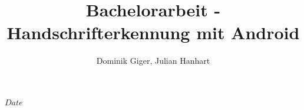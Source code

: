 \title{Bachelorarbeit - Handschrifterkennung mit Android}
\author{Dominik Giger, Julian Hanhart}
\SVNdate $Date$


\maketitle
%	


